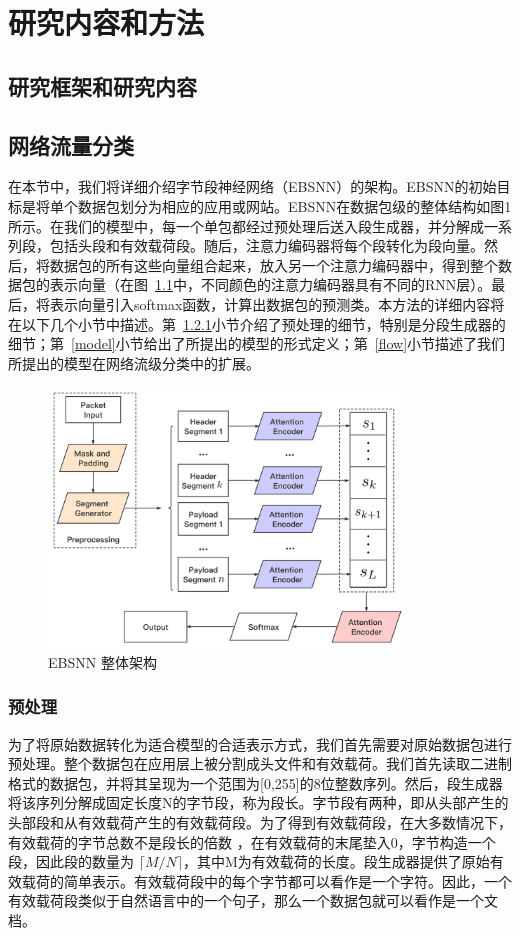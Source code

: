 \documentclass[degree=master,cjk-font=noto]{thuthesis}
\begin{document}
\chapter{研究内容和方法}

\section{研究框架和研究内容}

\section{网络流量分类}

在本节中，我们将详细介绍字节段神经网络（EBSNN）的架构。EBSNN的初始目标是将单个数据包划分为相应的应用或网站。EBSNN在数据包级的整体结构如图1所示。在我们的模型中，每一个单包都经过预处理后送入段生成器，并分解成一系列段，包括头段和有效载荷段。随后，注意力编码器将每个段转化为段向量。然后，将数据包的所有这些向量组合起来，放入另一个注意力编码器中，得到整个数据包的表示向量（在图~\ref{fig1}中，不同颜色的注意力编码器具有不同的RNN层）。最后，将表示向量引入softmax函数，计算出数据包的预测类。本方法的详细内容将在以下几个小节中描述。第~\ref{prep}小节介绍了预处理的细节，特别是分段生成器的细节；第~\ref{model}小节给出了所提出的模型的形式定义；第~\ref{flow}小节描述了我们所提出的模型在网络流级分类中的扩展。

\begin{figure}[!tp]
	\centerline{\includegraphics[width=9.5cm]{Overall_EBSNN.png}}
	\caption{EBSNN 整体架构}
	\label{fig1}
\end{figure}

\subsection{预处理}
\label{prep}

为了将原始数据转化为适合模型的合适表示方式，我们首先需要对原始数据包进行预处理。整个数据包在应用层上被分割成头文件和有效载荷。我们首先读取二进制格式的数据包，并将其呈现为一个范围为[0,255]的8位整数序列。然后，段生成器将该序列分解成固定长度N的字节段，称为段长。字节段有两种，即从头部产生的头部段和从有效载荷产生的有效载荷段。为了得到有效载荷段，在大多数情况下，有效载荷的字节总数不是段长的倍数 ，在有效载荷的末尾垫入0，字节构造一个段，因此段的数量为 $\lceil M / N \rceil$，其中M为有效载荷的长度。段生成器提供了原始有效载荷的简单表示。有效载荷段中的每个字节都可以看作是一个字符。因此，一个有效载荷段类似于自然语言中的一个句子，那么一个数据包就可以看作是一个文档。
\end{document}

